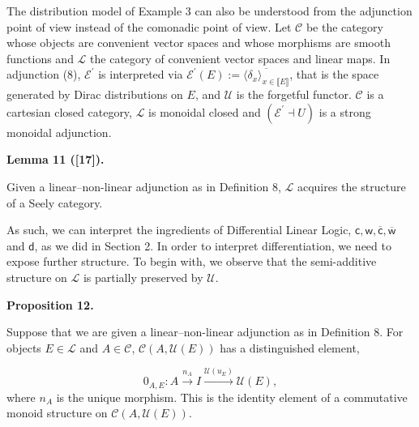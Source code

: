 The distribution model of Example 3 can also be understood from the adjunction point of view instead of the comonadic point of view. Let $\mathscr{C}$ be the category whose objects are convenient vector spaces and whose morphisms are smooth functions and $\mathscr{L}$ the category of convenient vector spaces and linear maps. In adjunction (8), $\mathcal{E}^{\prime}$ is interpreted via $\mathcal{E}^{\prime}(E):=\overline{\langle\delta_{x}\rangle_{x\in\llbracket{E}\rrbracket}}$, that is the space generated by Dirac distributions on $E$, and $\mathcal{U}$ is the forgetful functor. $\mathscr{C}$ is a cartesian closed category, $\mathscr{L}$ is monoidal closed and $(\mathcal{E}^{\prime}\dashv U)$ is a strong monoidal adjunction.\par
 
 
 
 
\par\medskip\noindent\textbf{Lemma 11 ([17]).}\par
 
 
Given a linear–non-linear adjunction as in Definition 8, $\mathscr{L}$ acquires the structure of a Seely category.\par
 
 
 
 
As such, we can interpret the ingredients of Differential Linear Logic, ${\mathsf{c}},{\mathsf{w}},\overline{\mathsf{c}},\overline{\mathsf{w}}$ and ${\mathsf{d}}$, as we did in Section 2. In order to interpret differentiation, we need to expose further structure. To begin with, we observe that the semi-additive structure on $\mathscr{L}$ is partially preserved by $\mathcal{U}$.\par
 
 
 
\par\medskip\noindent\textbf{Proposition 12.}\par
 
 
Suppose that we are given a linear–non-linear adjunction as in Definition 8. For objects $E\in\mathscr{L}$ and $A\in\mathscr{C}$, $\mathscr{C}(A,\mathcal{U}(E))$ has a distinguished element,\par
    \[0_{A,E}:A\xrightarrow{n_{A}}I\xrightarrow{\mathcal{U}(u_{E})}\mathcal{U}(E),\]    
where $n_{A}$ is the unique morphism. This is the identity element of a commutative monoid structure on $\mathscr{C}(A,\mathcal{U}(E))$.\par
 
